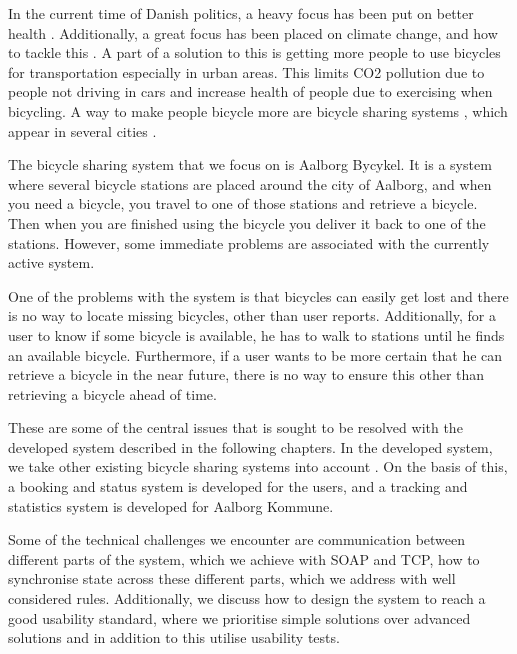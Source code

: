 	
	

In the current time of Danish politics, a heavy focus has been put on better health \citep{misc:nationalemaalhelbred}.
Additionally, a great focus has been placed on climate change, and how to tackle this \citep{misc:klima}.
A part of a solution to this is getting more people to use bicycles for transportation especially in urban areas.
This limits CO2 pollution due to people not driving in cars and increase health of people due to exercising when bicycling.
A way to make people bicycle more are bicycle sharing systems \citep{misc:impactofbikeshare}, which appear in several cities \citep{misc:cibi, misc:bycyklen, misc:AltaBicycleShare, misc:aalborgbycykelMain}.

The bicycle sharing system that we focus on is Aalborg Bycykel.
It is a system where several bicycle stations are placed around the city of Aalborg, and when you need a bicycle, you travel to one of those stations and retrieve a bicycle.
Then when you are finished using the bicycle you deliver it back to one of the stations.
However, some immediate problems are associated with the currently active system.

One of the problems with the system is that bicycles can easily get lost and there is no way to locate missing bicycles, other than user reports.
Additionally, for a user to know if some bicycle is available, he has to walk to stations until he finds an available bicycle.
Furthermore, if a user wants to be more certain that he can retrieve a bicycle in the near future, there is no way to ensure this other than retrieving a bicycle ahead of time.

These are some of the central issues that is sought to be resolved with the developed system described in the following chapters.
In the developed system, we take other existing bicycle sharing systems into account \citep{misc:cibi, misc:bycyklen, misc:AltaBicycleShare}.
On the basis of this, a booking and status system is developed for the users, and a tracking and statistics system is developed for Aalborg Kommune.

Some of the technical challenges we encounter are communication between different parts of the system, which we achieve with SOAP and TCP, how to synchronise state across these different parts, which we address with well considered rules.
Additionally, we discuss how to design the system to reach a good usability standard, where we prioritise simple solutions over advanced solutions and in addition to this utilise usability tests.

